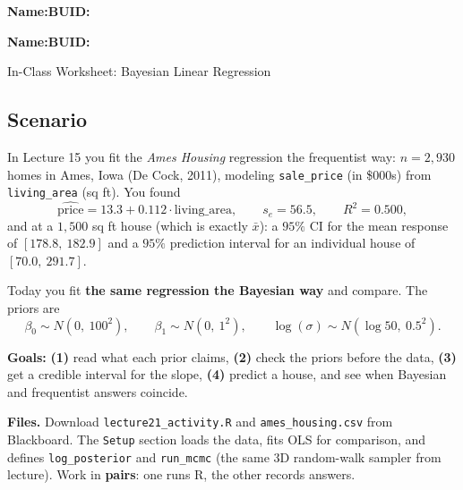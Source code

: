 \documentclass{article}
\newcommand{\blankline}[1]{\underline{\hspace{#1}}}
\begin{document}
\noindent\textbf{Name:}\blankline{2.25in}\hfill\textbf{BUID:}\blankline{1.55in}

\medskip

\noindent\textbf{Name:}\blankline{2.25in}\hfill\textbf{BUID:}\blankline{1.55in}\newline

\begin{center}
 \Large In-Class Worksheet: Bayesian Linear Regression
\end{center}

\subsection*{Scenario}
In Lecture 15 you fit the \emph{Ames Housing} regression the frequentist way: $n = 2{,}930$ homes in Ames, Iowa (De Cock, 2011), modeling \texttt{sale\_price} (in \$000s) from \texttt{living\_area} (sq ft). You found
\[
\widehat{\text{price}} = 13.3 + 0.112 \cdot \text{living\_area}, \qquad s_e = 56.5, \qquad R^2 = 0.500,
\]
and at a $1{,}500$ sq ft house (which is exactly $\bar x$): a $95\%$ CI for the mean response of $[178.8,\ 182.9]$ and a $95\%$ prediction interval for an individual house of $[70.0,\ 291.7]$.

\medskip

\noindent Today you fit \textbf{the same regression the Bayesian way} and compare. The priors are
\[
\beta_0 \sim N(0,\ 100^2), \qquad \beta_1 \sim N(0,\ 1^2), \qquad \log(\sigma) \sim N(\log 50,\ 0.5^2).
\]

\medskip
\noindent\textbf{Goals:}
\textbf{(1)} read what each prior claims,
\textbf{(2)} check the priors before the data,
\textbf{(3)} get a credible interval for the slope,
\textbf{(4)} predict a house, and see when Bayesian and frequentist answers coincide.

\medskip
\noindent\textbf{Files.} Download \texttt{lecture21\_activity.R} and \texttt{ames\_housing.csv} from Blackboard. The \texttt{Setup} section loads the data, fits OLS for comparison, and defines \texttt{log\_posterior} and \texttt{run\_mcmc} (the same 3D random-walk sampler from lecture). Work in \textbf{pairs}: one runs R, the other records answers.
\end{document}

